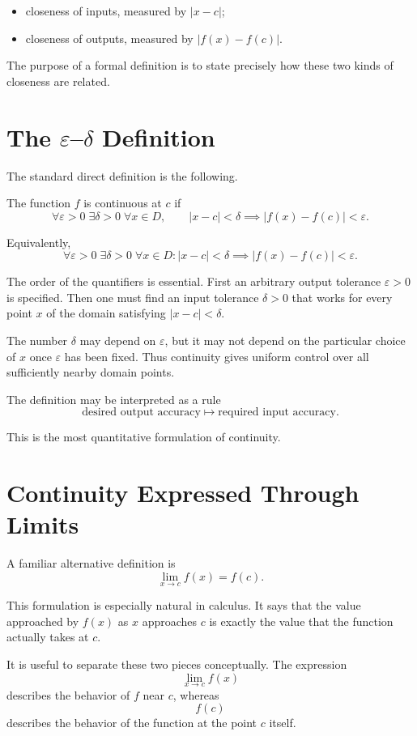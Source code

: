 \documentclass{essay}
\begin{document}
\begin{itemize}
    \item closeness of inputs, measured by $|x-c|$;
    \item closeness of outputs, measured by $|f(x)-f(c)|$.
\end{itemize}

The purpose of a formal definition is to state precisely how these two kinds of closeness are related.

\section{The $\varepsilon$--$\delta$ Definition}

The standard direct definition is the following.

The function $f$ is continuous at $c$ if
\[
\forall \varepsilon>0\;\exists\delta>0\;\forall x\in D,
\qquad
|x-c|<\delta
\implies
|f(x)-f(c)|<\varepsilon.
\]

Equivalently,
\[
\boxed{
\forall \varepsilon>0\;\exists\delta>0\;\forall x\in D:
|x-c|<\delta
\implies
|f(x)-f(c)|<\varepsilon.
}
\]

The order of the quantifiers is essential. First an arbitrary output tolerance $\varepsilon>0$ is specified. Then one must find an input tolerance $\delta>0$ that works for every point $x$ of the domain satisfying $|x-c|<\delta$.

The number $\delta$ may depend on $\varepsilon$, but it may not depend on the particular choice of $x$ once $\varepsilon$ has been fixed. Thus continuity gives uniform control over all sufficiently nearby domain points.

The definition may be interpreted as a rule
\[
\text{desired output accuracy}
\longmapsto
\text{required input accuracy}.
\]

This is the most quantitative formulation of continuity.

\section{Continuity Expressed Through Limits}

A familiar alternative definition is
\[
\boxed{
\lim_{x\to c} f(x)=f(c).
}
\]

This formulation is especially natural in calculus. It says that the value approached by $f(x)$ as $x$ approaches $c$ is exactly the value that the function actually takes at $c$.

It is useful to separate these two pieces conceptually. The expression
\[
\lim_{x\to c} f(x)
\]
describes the behavior of $f$ near $c$, whereas
\[
f(c)
\]
describes the behavior of the function at the point $c$ itself.
\end{document}
